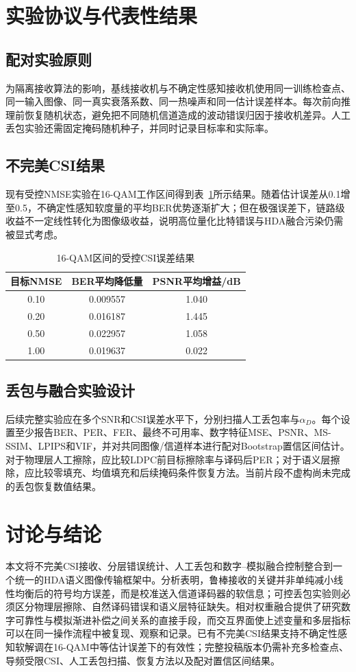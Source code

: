 \documentclass[conference]{IEEEtran}
\begin{document}
\section{实验协议与代表性结果}
\subsection{配对实验原则}
为隔离接收算法的影响，基线接收机与不确定性感知接收机使用同一训练检查点、同一输入图像、同一真实衰落系数、同一热噪声和同一估计误差样本。每次前向推理前恢复随机状态，避免把不同随机信道造成的波动错误归因于接收机差异。人工丢包实验还需固定掩码随机种子，并同时记录目标率和实际率。

\subsection{不完美CSI结果}
现有受控NMSE实验在16-QAM工作区间得到表~\ref{tab:nmse_results}所示结果。随着估计误差从0.1增至0.5，不确定性感知软度量的平均BER优势逐渐扩大；但在极强误差下，链路级收益不一定线性转化为图像级收益，说明高位量化比特错误与HDA融合污染仍需被显式考虑。

\begin{table}[t]
\centering
\caption{16-QAM区间的受控CSI误差结果}
\label{tab:nmse_results}
\begin{tabular}{c c c}
\toprule
目标NMSE & BER平均降低量 & PSNR平均增益/dB \\
\midrule
0.10 & 0.009557 & 1.040 \\
0.20 & 0.016187 & 1.445 \\
0.50 & 0.022957 & 1.058 \\
1.00 & 0.019637 & 0.022 \\
\bottomrule
\end{tabular}
\end{table}

\subsection{丢包与融合实验设计}
后续完整实验应在多个SNR和CSI误差水平下，分别扫描人工丢包率与$\alpha_D$。每个设置至少报告BER、PER、FER、最终不可用率、数字特征MSE、PSNR、MS-SSIM、LPIPS和VIF，并对共同图像/信道样本进行配对Bootstrap置信区间估计。对于物理层人工擦除，应比较LDPC前目标擦除率与译码后PER；对于语义层擦除，应比较零填充、均值填充和后续掩码条件恢复方法。当前片段不虚构尚未完成的丢包恢复数值结果。

\section{讨论与结论}
本文将不完美CSI接收、分层错误统计、人工丢包和数字--模拟融合控制整合到一个统一的HDA语义图像传输框架中。分析表明，鲁棒接收的关键并非单纯减小线性均衡后的符号均方误差，而是校准送入信道译码器的软信息；可控丢包实验则必须区分物理层擦除、自然译码错误和语义层特征缺失。相对权重融合提供了研究数字可靠性与模拟渐进补偿之间关系的直接手段，而交互界面使上述变量和多层指标可以在同一操作流程中被复现、观察和记录。已有不完美CSI结果支持不确定性感知软解调在16-QAM中等估计误差下的有效性；完整投稿版本仍需补充多检查点、导频受限CSI、人工丢包扫描、恢复方法以及配对置信区间结果。
\end{document}
